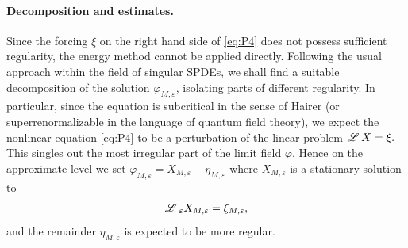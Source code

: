 \documentclass[a4paper,11pt]{article}
\numberwithin{equation}{section}
\newcommand{\LL}{\mathscr{L} \hspace{.2em}}
\begin{document}
\paragraph{Decomposition and estimates.} Since the forcing $\xi$ on the right
hand side of {\eqref{eq:P4}} does not possess sufficient regularity, the
energy method cannot be applied directly. Following the usual approach within
the field of singular SPDEs, we shall find a suitable decomposition of the
solution $\varphi_{M, \varepsilon}$, isolating parts of different regularity.
In particular, since the equation is subcritical in the sense of Hairer
{\cite{hairer_theory_2014}} (or superrenormalizable in the language of quantum
field theory), we expect the nonlinear equation {\eqref{eq:P4}} to be a
perturbation of the linear problem $ \LL X = \xi .$
This singles out the most irregular part of the limit field $\varphi$. Hence on
the approximate level we set $\varphi_{M, \varepsilon} = X_{M, \varepsilon} +
\eta_{M, \varepsilon}$ where $X_{M, \varepsilon}$ is a stationary solution to
\begin{equation}
 \LL_{\varepsilon} X_{M,\varepsilon} = \xi_{M,\varepsilon} , \label{eq:X}
\end{equation}
and the remainder
$\eta_{M, \varepsilon}$ is expected to be more regular.
\end{document}
